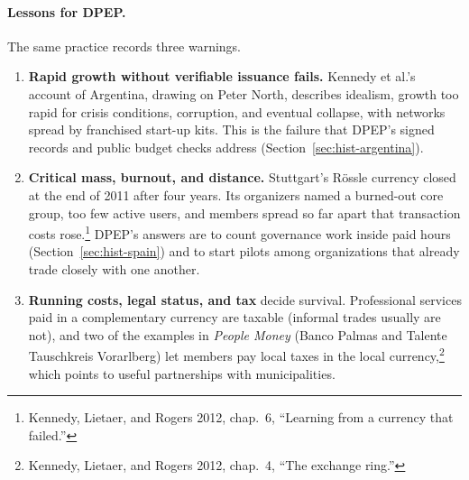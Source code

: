 \documentclass[10pt,twoside,openany]{book}
\theoremstyle{dpepstyle}
\begin{document}
\paragraph{Lessons for DPEP.} The same practice records three warnings.
\begin{enumerate}[leftmargin=1.8em,itemsep=2pt]
  \item \textbf{Rapid growth without verifiable issuance fails.} Kennedy et al.'s account of Argentina, drawing on Peter North, describes idealism, growth too rapid for crisis conditions, corruption, and eventual collapse, with networks spread by franchised start-up kits. This is the failure that DPEP's signed records and public budget checks address (Section~\ref{sec:hist-argentina}).
  \item \textbf{Critical mass, burnout, and distance.} Stuttgart's R\"ossle currency closed at the end of 2011 after four years. Its organizers named a burned-out core group, too few active users, and members spread so far apart that transaction costs rose.\footnote{Kennedy, Lietaer, and Rogers 2012, chap.~6, ``Learning from a currency that failed.''} DPEP's answers are to count governance work inside paid hours (Section~\ref{sec:hist-spain}) and to start pilots among organizations that already trade closely with one another.
  \item \textbf{Running costs, legal status, and tax} decide survival. Professional services paid in a complementary currency are taxable (informal trades usually are not), and two of the examples in \emph{People Money} (Banco Palmas and Talente Tauschkreis Vorarlberg) let members pay local taxes in the local currency,\footnote{Kennedy, Lietaer, and Rogers 2012, chap.~4, ``The exchange ring.''} which points to useful partnerships with municipalities.
\end{enumerate}
\end{document}
